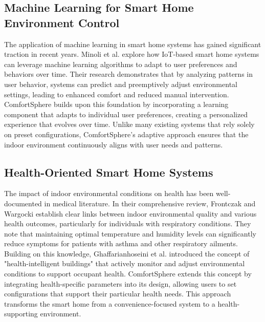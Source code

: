 \documentclass[a4paper]{scrartcl}
\begin{document}
    \subsection{Machine Learning for Smart Home Environment Control}
    The application of machine learning in smart home systems has gained significant traction in recent years. Minoli et al. \cite{paper6} explore how IoT-based smart home systems can leverage machine learning algorithms to adapt to user preferences and behaviors over time. Their research demonstrates that by analyzing patterns in user behavior, systems can predict and preemptively adjust environmental settings, leading to enhanced comfort and reduced manual intervention. ComfortSphere builds upon this foundation by incorporating a learning component that adapts to individual user preferences, creating a personalized experience that evolves over time. Unlike many existing systems that rely solely on preset configurations, ComfortSphere's adaptive approach ensures that the indoor environment continuously aligns with user needs and patterns.

    \subsection{Health-Oriented Smart Home Systems}
    The impact of indoor environmental conditions on health has been well-documented in medical literature. In their comprehensive review, Frontczak and Wargocki \cite{paper7} establish clear links between indoor environmental quality and various health outcomes, particularly for individuals with respiratory conditions. They note that maintaining optimal temperature and humidity levels can significantly reduce symptoms for patients with asthma and other respiratory ailments. Building on this knowledge, Ghaffarianhoseini et al. \cite{paper8} introduced the concept of "health-intelligent buildings" that actively monitor and adjust environmental conditions to support occupant health. ComfortSphere extends this concept by integrating health-specific parameters into its design, allowing users to set configurations that support their particular health needs. This approach transforms the smart home from a convenience-focused system to a health-supporting environment.
\end{document}
